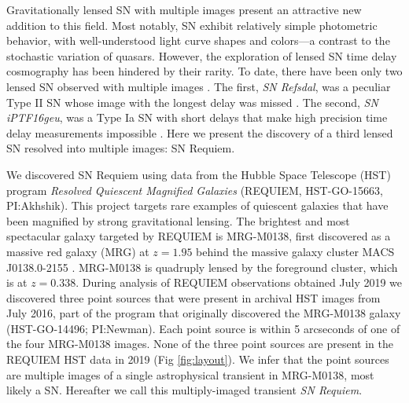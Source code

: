\documentclass[12pt,dvipsnames]{article}
\begin{document}
Gravitationally lensed SN with multiple images present an attractive new addition to this field. Most notably, SN exhibit relatively simple photometric behavior, with well-understood light curve shapes and colors---a contrast to the stochastic variation of quasars.  However, the exploration of lensed SN time delay cosmography has been hindered by their rarity.  To date, there have been only two lensed SN observed with multiple images \cite{kelly_multiple_2015,goobar_iptf16geu:_2017}. The first, {\it SN Refsdal}, was a peculiar Type II SN whose image with the longest delay was missed \cite{kelly_SNRefsdal_2016}. The second, {\it SN iPTF16geu}, was a Type Ia SN with short delays that make high precision time delay measurements impossible \cite{dhawan_magnification_2020}. Here we present the discovery 
of a third lensed SN resolved into multiple images: SN Requiem. 



We discovered SN Requiem using data from the Hubble Space Telescope (HST) program {\it Resolved Quiescent Magnified Galaxies} (REQUIEM, HST-GO-15663, PI:Akhshik). This project targets rare examples of quiescent galaxies that have been magnified by strong gravitational lensing. %
The brightest and most spectacular galaxy targeted by REQUIEM
is MRG-M0138, first discovered as a massive red galaxy (MRG) at $z=1.95$ \cite{newman_resolving_2018} behind the massive galaxy cluster MACS J0138.0-2155 \cite{ebeling_macs_2001}.
MRG-M0138 is quadruply lensed by the foreground cluster, which is at $z=0.338$.  
During analysis of REQUIEM observations obtained July 2019 we discovered three point 
sources that were present in archival HST images from July 2016, part of the program 
that originally discovered the MRG-M0138 galaxy (HST-GO-14496; PI:Newman). 
Each point source is within 5 arcseconds of one of the four MRG-M0138 images.  None of the
three point sources are present in the REQUIEM HST data in 2019 (Fig \ref{fig:layout}). We infer that 
the point sources are multiple images of a single astrophysical 
transient in MRG-M0138, most likely a SN. Hereafter we call this multiply-imaged transient {\it SN Requiem}.
\end{document}
